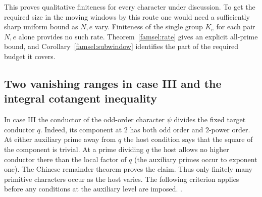 This proves qualitative finiteness for every character under
discussion. To get the required size in the moving windows by this
route one would need a sufficiently sharp uniform bound as \(N,e\)
vary. Finiteness of the single group \(K_e\) for each pair \(N,e\)
alone provides no such rate. Theorem~\ref{famsel:rate} gives an explicit
all-prime bound, and Corollary~\ref{famsel:subwindow} identifies the
part of the required budget it covers.

\subsection{Two vanishing ranges in case III and the integral cotangent inequality}
\label{newcoh:oddbranch}

In case III the conductor of the odd-order character \(\psi\) divides
the fixed target conductor \(q\). Indeed, its component at \(2\) has
both odd order and \(2\)-power order. At either auxiliary prime away
from \(q\) the host condition says that the square of the component
is trivial. At a prime dividing \(q\) the host allows no higher
conductor there than the local factor of \(q\) (the auxiliary primes
occur to exponent one). The Chinese remainder theorem proves the
claim. Thus only finitely many primitive characters occur as the host
varies. The following criterion applies before any conditions at the
auxiliary level are imposed.
.

